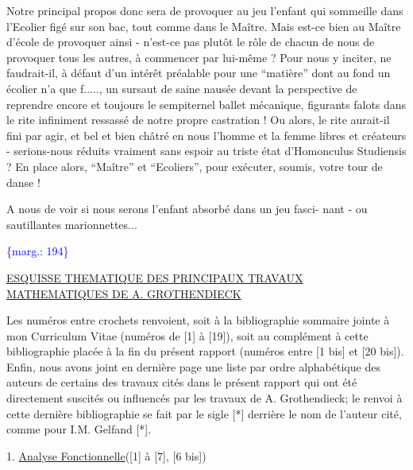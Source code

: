 \documentclass[11pt]{article}
\newcommand{\scanpage}[1]{\par\bigskip\noindent{\small\sffamily[scan #1]}\par}
\newcommand{\margin}[1]{\textcolor{blue}{\{\textsf{marg.:} #1\}}}
\newcommand{\uline}[1]{\underline{#1}}
\begin{document}
Notre principal propos donc sera de provoquer au jeu l'enfant qui
sommeille dans l'Ecolier figé sur son bac, tout comme dans le Maître. Mais
est-ce bien au Maître d'école de provoquer ainsi - n'est-ce pas plutôt le rôle
de chacun de nous de provoquer tous les autres, à commencer par lui-même ?
Pour nous y inciter, ne faudrait-il, à défaut d'un intérêt  préalable pour une
``matière'' dont au fond un écolier n'a que f....., un sursaut de saine nausée
devant la perspective de reprendre encore et toujours le sempiternel ballet
mécanique, figurants falots dans le rite infiniment ressassé de notre propre
castration ! Ou alors, le rite aurait-il fini par agir, et bel et bien châtré
en nous l'homme et la femme libres et créateurs - serions-nous réduits vraiment
sans espoir au triste état d'Homonculus Studiensis ? En place alors, ``Maître''
et ``Ecoliers'', pour exécuter, soumis, votre tour de danse !

A nous de voir si nous serons l'enfant absorbé dans un jeu fasci-%
nant - ou sautillantes marionnettes...

\margin{194}

\clearpage
\scanpage{119/196}
\uline{ESQUISSE THEMATIQUE DES PRINCIPAUX TRAVAUX MATHEMATIQUES DE A. GROTHENDIECK}

Les numéros entre crochets renvoient, soit à la bibliographie sommaire
jointe à mon Curriculum Vitae (numéros de [1] à [19]), soit au complément à
cette bibliographie placée à la fin du présent rapport (numéros entre [1 bis]
et [20 bis]). Enfin, nous avons joint en dernière page une liste par ordre
alphabétique des auteurs de certains des travaux cités dans le présent
rapport qui ont été directement suscités ou influencés par les travaux de
A. Grothendieck; le renvoi à cette dernière bibliographie se fait par le sigle
[*] derrière le nom de l'auteur cité, comme pour I.M. Gelfand [*].

1. \uline{Analyse Fonctionnelle}([1] à [7], [6 bis])
\end{document}
